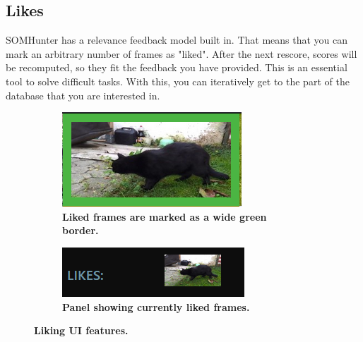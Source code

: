 \subsection{Likes}

SOMHunter has a relevance feedback model built in. That means that you can mark an arbitrary number of frames as "liked". After the next rescore, scores will be recomputed, so they fit the feedback you have provided. This is an essential tool to solve difficult tasks. With this, you can iteratively get to the part of the database that you are interested in.

\begin{figure}[h]
	\centering
  \begin{subfigure}[b]{0.4\textwidth}
      \centering
      \includegraphics[width=\textwidth]{img/liked-frame.png}
      \caption{\textbf{Liked frames are marked as a wide green border.}}
      \label{fig:likes-a}
  \end{subfigure}
  \hfill
  \begin{subfigure}[b]{0.55\textwidth}
      \centering
      \includegraphics[width=\textwidth]{img/likes-panel.png}
      \caption{\textbf{Panel showing currently liked frames.}}
      \label{fig:likes-b}
  \end{subfigure}
	
  \caption{\textbf{Liking UI features.}}
	
\end{figure}

